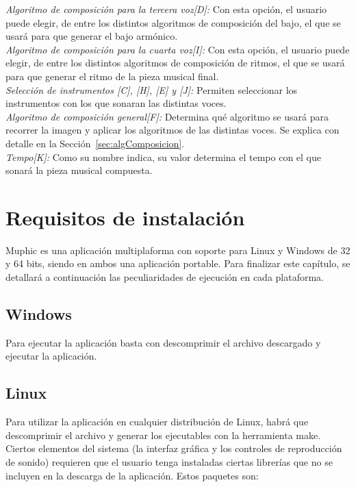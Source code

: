 		\noindent\textit{Algoritmo de composición para la tercera voz[D]:} Con esta opción, el usuario puede elegir, de entre los distintos algoritmos de composición del bajo, el que se usará para que generar el bajo armónico.\\
		
		\noindent\textit{Algoritmo de composición para la cuarta voz[I]:} Con esta opción, el usuario puede elegir, de entre los distintos algoritmos de composición de ritmos, el que se usará para que generar el ritmo de la pieza musical final.\\
		
		\noindent\textit{Selección de instrumentos [C], [H], [E] y [J]:} Permiten seleccionar los instrumentos con los que sonaran las distintas voces.\\

		\noindent\textit{Algoritmo de composición general[F]:} Determina qué algoritmo se usará para recorrer la imagen y aplicar los algoritmos de las distintas voces. Se explica con detalle en la Sección~\ref{sec:algComposicion}.\\

		\noindent\textit{Tempo[K]:} Como su nombre indica, su valor determina el tempo con el que sonará la pieza musical compuesta.\\
		
	\section{Requisitos de instalación}
	\label{sec:reqinstalacion}
	
		Muphic es una aplicación multiplaforma con soporte para Linux y Windows de 32 y 64 bits, siendo en ambos una aplicación portable. Para finalizar este capítulo, se detallará a continuación las peculiaridades de ejecución en cada plataforma.
		
		\subsection{Windows}
		
		Para ejecutar la aplicación basta con descomprimir el archivo descargado y ejecutar la aplicación.
		
		\subsection{Linux}
		
		Para utilizar la aplicación en cualquier distribución de Linux, habrá que descomprimir el archivo y generar los ejecutables con la herramienta make. Ciertos elementos del sistema (la interfaz gráfica y los controles de reproducción de sonido) requieren que el usuario tenga instaladas ciertas librerías que no se incluyen en la descarga de la aplicación. Estos paquetes son:
		
